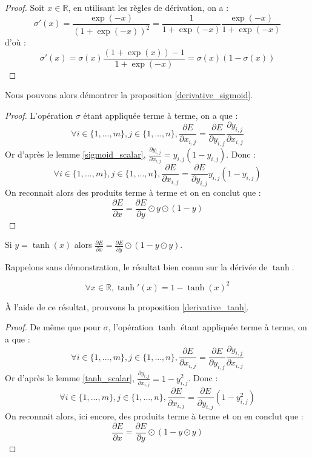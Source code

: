 \begin{proof}
Soit $x \in \mathbb{R}$, en utilisant les règles de dérivation, on a :
$$
\sigma'(x) = \frac{\exp(-x)}{(1 + \exp(-x))^2} = \frac{1}{1 + \exp(-x)}\frac{\exp(-x)}{1 + \exp(-x)}
$$
d'où :
$$
\sigma'(x) = \sigma(x)\frac{(1 + \exp(x)) - 1}{1 + \exp(-x)} =  \sigma(x)(1 - \sigma(x))
$$
\end{proof}

Nous pouvons alors démontrer la proposition \ref{derivative_sigmoid}.

\begin{proof}
L'opération $\sigma$ étant appliquée terme à terme, on a que :
$$
\forall i \in \{1, ..., m\}, j \in \{1, ..., n\}, \frac{\partial E}{\partial x_{i, j}} = \frac{\partial E}{\partial y_{i, j}}\frac{\partial y_{i, j}}{\partial x_{i, j}}
$$
Or d'après le lemme \ref{sigmoid_scalar}, $\frac{\partial y_{i, j}}{\partial x_{i, j}} = y_{i, j}(1 - y_{i, j})$. Donc :
$$
\forall i \in \{1, ..., m\}, j \in \{1, ..., n\}, \frac{\partial E}{\partial x_{i, j}} = \frac{\partial E}{\partial y_{i, j}}y_{i, j}(1 - y_{i, j})
$$
On reconnait alors des produits terme à terme et on en conclut que :
$$
\frac{\partial E}{\partial x} = \frac{\partial E}{\partial y} \odot y \odot (1 - y)
$$
\end{proof}

\begin{proposition}
Si $y = \tanh(x)$ alors $\frac{\partial E}{\partial x} = \frac{\partial E}{\partial y} \odot (1 - y \odot y)$.
\label{derivative_tanh}
\end{proposition}

Rappelons sans démonstration, le résultat bien connu sur la dérivée de $\tanh$.

\begin{lemma}
$$ 
\forall x \in \mathbb{R}, \tanh'(x) = 1 - \tanh(x)^2
$$
\label{tanh_scalar}
\end{lemma}

À l'aide de ce résultat, prouvons la proposition \ref{derivative_tanh}.

\begin{proof}
De même que pour $\sigma$, l'opération $\tanh$ étant appliquée terme à terme, on a que :
$$
\forall i \in \{1, ..., m\}, j \in \{1, ..., n\}, \frac{\partial E}{\partial x_{i, j}} = \frac{\partial E}{\partial y_{i, j}}\frac{\partial y_{i, j}}{\partial x_{i, j}}
$$
Or d'après le lemme \ref{tanh_scalar}, $\frac{\partial y_{i, j}}{\partial x_{i, j}} = 1 - y_{i, j}^2$. Donc :
$$
\forall i \in \{1, ..., m\}, j \in \{1, ..., n\}, \frac{\partial E}{\partial x_{i, j}} = \frac{\partial E}{\partial y_{i, j}}(1 - y_{i, j}^2)
$$
On reconnait alors, ici encore, des produits terme à terme et on en conclut que :
$$
\frac{\partial E}{\partial x} = \frac{\partial E}{\partial y} \odot (1 - y \odot y)
$$
\end{proof}


